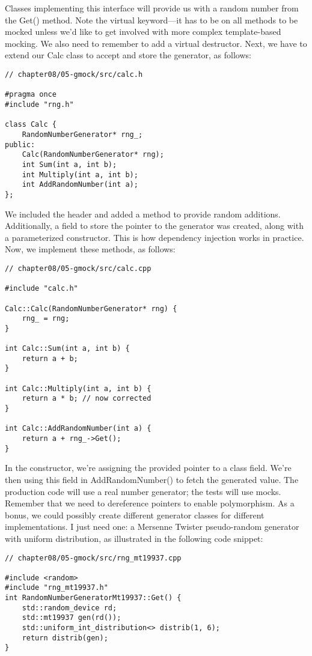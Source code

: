 Classes implementing this interface will provide us with a random number from the Get() method. Note the virtual keyword—it has to be on all methods to be mocked unless we'd like to get involved with more complex template-based mocking. We also need to remember to add a virtual destructor. Next, we have to extend our Calc class to accept and store the generator, as follows:

\begin{lstlisting}[style=styleCXX]
// chapter08/05-gmock/src/calc.h

#pragma once
#include "rng.h"

class Calc {
	RandomNumberGenerator* rng_;
public:
	Calc(RandomNumberGenerator* rng);
	int Sum(int a, int b);
	int Multiply(int a, int b);
	int AddRandomNumber(int a);
};
\end{lstlisting}

We included the header and added a method to provide random additions. Additionally, a field to store the pointer to the generator was created, along with a parameterized constructor. This is how dependency injection works in practice. Now, we implement these methods, as follows:

\begin{lstlisting}[style=styleCXX]
// chapter08/05-gmock/src/calc.cpp

#include "calc.h"

Calc::Calc(RandomNumberGenerator* rng) {
	rng_ = rng;
}

int Calc::Sum(int a, int b) {
	return a + b;
}

int Calc::Multiply(int a, int b) {
	return a * b; // now corrected
}

int Calc::AddRandomNumber(int a) {
	return a + rng_->Get();
}
\end{lstlisting}

In the constructor, we're assigning the provided pointer to a class field. We're then using this field in AddRandomNumber() to fetch the generated value. The production code will use a real number generator; the tests will use mocks. Remember that we need to dereference pointers to enable polymorphism. As a bonus, we could possibly create different generator classes for different implementations. I just need one: a Mersenne Twister pseudo-random generator with uniform distribution, as illustrated in the following code snippet:

\begin{lstlisting}[style=styleCXX]
// chapter08/05-gmock/src/rng_mt19937.cpp

#include <random>
#include "rng_mt19937.h"
int RandomNumberGeneratorMt19937::Get() {
	std::random_device rd;
	std::mt19937 gen(rd());
	std::uniform_int_distribution<> distrib(1, 6);
	return distrib(gen);
}
\end{lstlisting}

